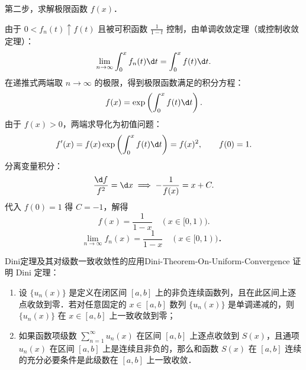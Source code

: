 \begin{solution}
    第二步，求解极限函数 $f(x)$．

    由于 $0 < f_n(t) \uparrow f(t)$ 且被可积函数 $\frac{1}{1 - t}$ 控制，由单调收敛定理（或控制收敛定理）：
    \begin{equation}
        \lim_{n\to\infty} \int_0^x f_n(t)\d t = \int_0^x f(t)\d t.
    \end{equation}
    在递推式两端取 $n \to \infty$ 的极限，得到极限函数满足的积分方程：
    \begin{equation}
        f(x) = \exp\left( \int_0^x f(t)\d t \right).
    \end{equation}
    由于 $f(x) > 0$，两端求导化为初值问题：
    \begin{equation}
        f'(x) = f(x) \exp\left( \int_0^x f(t)\d t \right) = f(x)^2, \qquad f(0) = 1.
    \end{equation}
    分离变量积分：
    \begin{equation}
        \frac{\d f}{f^2} = \d x \implies -\frac{1}{f(x)} = x + C.
    \end{equation}
    代入 $f(0) = 1$ 得 $C = -1$，解得
    \begin{equation}
        f(x) = \frac{1}{1 - x} \quad (x \in [0, 1)).
    \end{equation}
    \begin{equation}
        \boxed{\lim_{n\to\infty} f_n(x) = \frac{1}{1 - x} \quad (x \in [0, 1))．}
    \end{equation}
\end{solution}

\begin{problem}{Dini定理及其对级数一致收敛性的应用}{Dini-Theorem-On-Uniform-Convergence}
    证明 Dini 定理：
    \begin{enumerate}
        \item 设 $\{u_n(x)\}$ 是定义在闭区间 $[a, b]$ 上的非负连续函数列，且在此区间上逐点收敛到零．若对任意固定的 $x \in [a, b]$ 数列 $\{u_n(x)\}$ 是单调递减的，则 $\{u_n(x)\}$ 在 $x \in [a, b]$ 上一致收敛到零；
        \item 如果函数项级数 $\sum_{n=1}^\infty u_n(x)$ 在区间 $[a, b]$ 上逐点收敛到 $S(x)$，且通项 $u_n(x)$ 在区间 $[a, b]$ 上是连续且非负的，那么和函数 $S(x)$ 在 $[a, b]$ 连续的充分必要条件是此级数在 $[a, b]$ 上一致收敛．
    \end{enumerate}
\end{problem}


